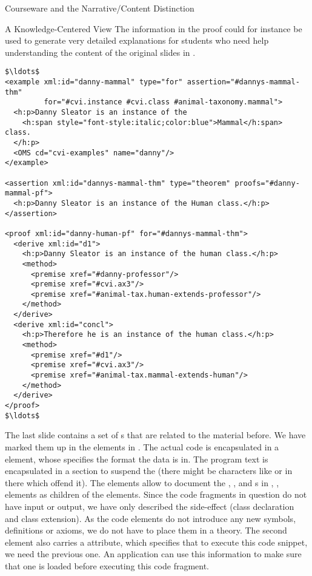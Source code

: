 \begin{omgroup}[id=courseware]{Courseware and the Narrative/Content Distinction}
\begin{omgroup}[id=courseware.knowledge-centered]{A Knowledge-Centered View}
The information in the proof could for instance be used to generate very detailed
explanations for students who need help understanding the content of the original
slides in {}.

\begin{lstlisting}[label=lst:var-cvi-ex,mathescape,
    caption={An Alternative Representation Using {\element{example}} Elements},
    index={example,proof,assertion,derive,premise}]
$\ldots$
<example xml:id="danny-mammal" type="for" assertion="#dannys-mammal-thm"
         for="#cvi.instance #cvi.class #animal-taxonomy.mammal">
  <h:p>Danny Sleator is an instance of the 
    <h:span style="font-style:italic;color:blue">Mammal</h:span> class. 
  </h:p>
  <OMS cd="cvi-examples" name="danny"/>
</example>

<assertion xml:id="dannys-mammal-thm" type="theorem" proofs="#danny-mammal-pf">
  <h:p>Danny Sleator is an instance of the Human class.</h:p>
</assertion>

<proof xml:id="danny-human-pf" for="#dannys-mammal-thm">
  <derive xml:id="d1">
    <h:p>Danny Sleator is an instance of the human class.</h:p>
    <method>
      <premise xref="#danny-professor"/>
      <premise xref="#cvi.ax3"/>
      <premise xref="#animal-tax.human-extends-professor"/>
    </method>
  </derive>
  <derive xml:id="concl">
    <h:p>Therefore he is an instance of the human class.</h:p>
    <method>
      <premise xref="#d1"/>
      <premise xref="#cvi.ax3"/>
      <premise xref="#animal-tax.mammal-extends-human"/>
    </method>
  </derive>
</proof>
$\ldots$
\end{lstlisting}

The last slide contains a set of {} {s} that are
related to the material before.  We have marked them up in the {} elements
in {}. The actual code is encapsulated in a {} element,
whose {} specifies the format the data is in. The program text is
encapsulated in a {} section to suspend the {\xml} {}
(there might be characters like {\snippet{<}} or {\snippet{\&}} in there which offend it).
The {} elements allow to document the {},
{}, and {s} in {},
{}, {} elements as children of the {}
elements. Since the code fragments in question do not have input or output, we have only
described the side-effect (class declaration and class extension). As the code elements do
not introduce any new symbols, definitions or axioms, we do not have to place them in a
theory. The second {} element also carries a {}
attribute, which specifies that to execute this code snippet, we need the previous one. An
application can use this information to make sure that one is loaded before executing this
code fragment.


\end{omgroup}
\end{omgroup}
